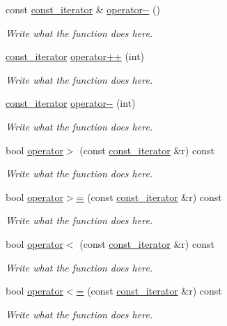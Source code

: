 \begin{DoxyCompactItemize}
const \hyperlink{classMesh__t_1_1const__iterator}{const\+\_\+iterator} \& \hyperlink{classMesh__t_1_1const__iterator_ab0bb21309502c144e73cd4a4669632f9}{operator-\/-\/} ()
\begin{DoxyCompactList}\small\item\em Write what the function does here. \end{DoxyCompactList}\item 
\hyperlink{classMesh__t_1_1const__iterator}{const\+\_\+iterator} \hyperlink{classMesh__t_1_1const__iterator_ae4dfd51c231b4aca1ccd37af446452bc}{operator++} (int)
\begin{DoxyCompactList}\small\item\em Write what the function does here. \end{DoxyCompactList}\item 
\hyperlink{classMesh__t_1_1const__iterator}{const\+\_\+iterator} \hyperlink{classMesh__t_1_1const__iterator_a55ba9083411021658f0f226773f97b09}{operator-\/-\/} (int)
\begin{DoxyCompactList}\small\item\em Write what the function does here. \end{DoxyCompactList}\item 
bool \hyperlink{classMesh__t_1_1const__iterator_a070ce17271dafc69c4de9f231bd667da}{operator$>$} (const \hyperlink{classMesh__t_1_1const__iterator}{const\+\_\+iterator} \&r) const 
\begin{DoxyCompactList}\small\item\em Write what the function does here. \end{DoxyCompactList}\item 
bool \hyperlink{classMesh__t_1_1const__iterator_a376992b96fd309bce6335e4ad4c564f7}{operator$>$=} (const \hyperlink{classMesh__t_1_1const__iterator}{const\+\_\+iterator} \&r) const 
\begin{DoxyCompactList}\small\item\em Write what the function does here. \end{DoxyCompactList}\item 
bool \hyperlink{classMesh__t_1_1const__iterator_ab072053e0d01075225a883405e5e6953}{operator$<$} (const \hyperlink{classMesh__t_1_1const__iterator}{const\+\_\+iterator} \&r) const 
\begin{DoxyCompactList}\small\item\em Write what the function does here. \end{DoxyCompactList}\item 
bool \hyperlink{classMesh__t_1_1const__iterator_a6ed80538dc270a480f24efeca60a2c39}{operator$<$=} (const \hyperlink{classMesh__t_1_1const__iterator}{const\+\_\+iterator} \&r) const 
\begin{DoxyCompactList}\small\item\em Write what the function does here. \end{DoxyCompactList}\end{DoxyCompactItemize}
